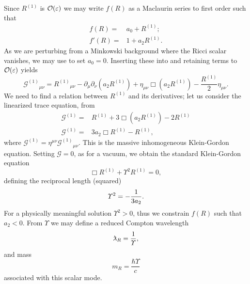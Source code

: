 Since $R^{(1)}$ is $\mathcal{O}({\varepsilon})$ we may write $f(R)$ as a Maclaurin series to first order such that
\begin{align}
f(R) = {} & a_0 + R^{(1)};\\
f'(R) = {} & 1 + a_2 R^{(1)}.
\end{align}
As we are perturbing from a Minkowski background where the Ricci scalar vanishes, we may use  to set $a_0 = 0$. Inserting these into  and retaining terms to $\mathcal{O}({\varepsilon})$ yields
\begin{equation}
{\mathcal{G}^{(1)}}_{\mu\nu} = {R^{(1)}}_{\mu\nu} - \partial_\mu\partial_\nu(a_2 R^{(1)}) + \eta_{\mu\nu}\Box(a_2 R^{(1)}) - \frac{R^{(1)}}{2}\eta_{\mu\nu}.
\label{eq:Field}
\end{equation}
We need to find a relation between $R^{(1)}$ and its derivatives; let us consider the linearized trace equation, from 
\begin{align}
\mathcal{G}^{(1)} = {} & R^{(1)} + 3 \Box(a_2 R^{(1)}) - 2 R^{(1)} \nonumber \\
\mathcal{G}^{(1)} = {} & 3a_2 \Box R^{(1)} - R^{(1)},
\label{eq:Box_R}
\end{align}
where $\mathcal{G}^{(1)} = \eta^{\mu\nu}{\mathcal{G}^{(1)}}_{\mu\nu}$. This is the massive inhomogeneous Klein-Gordon equation. Setting $\mathcal{G} = 0$, as for a vacuum, we obtain the standard Klein-Gordon equation
\begin{equation}
\Box R^{(1)} + \Upsilon^2 R^{(1)} = 0,
\end{equation}
defining the reciprocal length (squared)
\begin{equation}
\Upsilon^2 = -\frac{1}{3a_2}.
\end{equation}
For a physically meaningful solution $\Upsilon^2 > 0$, thus we constrain $f(R)$ such that $a_2 < 0$\cite{Schmidt1986, Teyssandier1990, Olmo2005c, Corda2007}. From $\Upsilon$ we may define a reduced Compton wavelength
\begin{equation}
\lambdabar_R = \recip{\Upsilon},
\end{equation}
and mass
\begin{equation}
m_R = \frac{\hbar\Upsilon}{c}
\end{equation}
associated with this scalar mode.

